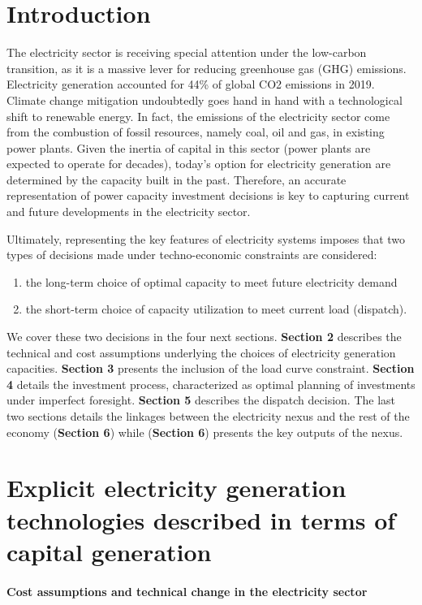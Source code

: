\section{Introduction}
The electricity sector is receiving special attention under the low-carbon transition, as it is a massive lever for reducing greenhouse gas (GHG) emissions. Electricity generation accounted for 44\% of global CO2 emissions in 2019. Climate change mitigation undoubtedly goes hand in hand with a technological shift to renewable energy. In fact, the emissions of the electricity sector come from the combustion of fossil resources, namely coal, oil and gas, in existing power plants. Given the inertia of capital in this sector (power plants are expected to operate for decades), today's option for electricity generation are determined by the capacity built in the past. Therefore, an accurate representation of power capacity investment decisions is key to capturing current and future developments in the electricity sector.


Ultimately, representing the key features of electricity systems imposes that two types of decisions made under techno-economic constraints are considered:
\begin{enumerate}
    \item the long-term choice of optimal capacity to meet future electricity demand
    \item the short-term choice of capacity utilization to meet current load (dispatch).
\end{enumerate}

We cover these two decisions in the four next sections. \textbf{Section 2} describes the technical and cost assumptions underlying the choices of electricity generation capacities. \textbf{Section 3} presents the inclusion of the load curve constraint. \textbf{Section 4} details the investment process, characterized as optimal planning of investments under imperfect foresight. \textbf{Section 5} describes the dispatch decision. The last two sections details the linkages between the electricity nexus and the rest of the economy (\textbf{Section 6}) while (\textbf{Section 6}) presents the key outputs of the nexus.

\section{Explicit electricity generation technologies described in terms of capital generation}

\paragraph{ Cost assumptions and technical change in the electricity sector}

